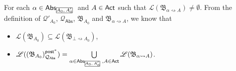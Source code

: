 \documentclass[preprint,12pt]{elsarticle}
\newcommand\rectangled[1]{\tikz[baseline=(torect.base)]{
    \node[shape = rectangle, draw, inner sep=0pt, outer sep = 0pt] (torect) {#1}
    }
}
\newcommand{\mrectangled}[1]{\text{\rectangled{\ensuremath{#1}}}}
\newcommand{\mhcancel}[1]{\mrectangled{#1}}
\newcommand\Qq{{\mathcal{Q} }}
\newcommand\act{{\sf Act}}
\newcommand\post{{\mathsf{post} }}
\newcommand\abs{{\mathsf{Abs} }}
\newcommand\AutReach{\mathscr{R}}
\newcommand{\id}{\mathsf{id}}
\newcommand\Aut{{\mathfrak{A} }}
\newcommand\AutB{{\mathfrak{B} }}
\newcommand\Lang{{\mathscr{L} }}
\newcommand{\WOTrNFA}{\textsf{WPOTrNFA}}
\newcommand{\NFA}{\textsf{NFA}}
\newcommand\topact{\mathsf{Top}}
\begin{document}
{%


For each $\alpha\in\abs_{\mhcancel{A_0,A_0'}}$ and $A\in\act$ such that $\Lang(\AutB_{\alpha\rightsquigarrow A})\neq \emptyset$.
From the definition of $\Qq'_{A_0}$, $\Qq_{\abs}$, $\AutB_{A_0}$ and $\AutB_{\alpha\rightsquigarrow A}$, we know that
\begin{itemize}
    \item $\Lang(\AutB_{A_0})\subseteq\Lang(\AutB_{\bot\rightsquigarrow A_0})$,
    \item $\Lang((\AutB_{A_0})^{\post^*}_{\Qq_{\abs}}) = \bigcup\limits_{\alpha\in\abs_{\mhcancel{A_0,A_0'}}, A\in\act}\Lang(\AutB_{\alpha\rightsquigarrow A})$.
\end{itemize}

}
\end{document}
